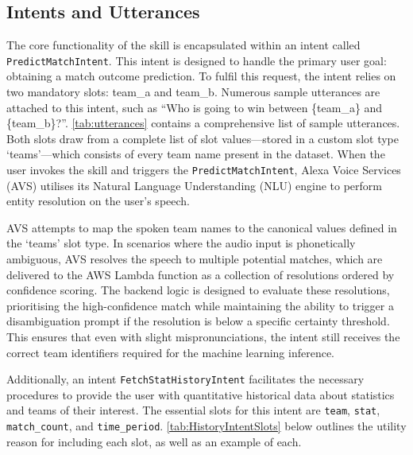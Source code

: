 \subsection{Intents and Utterances}
The core functionality of the skill is encapsulated within an intent called \texttt{PredictMatchI\-ntent}. This intent is designed to handle the primary user goal: obtaining a match outcome prediction. To fulfil this request, the intent relies on two mandatory \glspl{slot}: team\_a and team\_b. Numerous sample utterances are attached to this intent, such as ``Who is going to win between \{team\_a\} and \{team\_b\}?''. \autoref{tab:utterances} contains a comprehensive list of sample utterances. Both slots draw from a complete list of slot values---stored in a custom slot type `teams'---which consists of every team name present in the dataset. When the user invokes the skill and triggers the \texttt{PredictMatchIntent}, Alexa Voice Services (AVS) utilises its Natural Language Understanding (NLU) engine to perform entity resolution on the user's speech.

AVS attempts to map the spoken team names to the canonical values defined in the `teams' slot type. In scenarios where the audio input is phonetically ambiguous, AVS resolves the speech to multiple potential matches, which are delivered to the AWS Lambda function as a collection of resolutions ordered by confidence scoring. The backend logic is designed to evaluate these resolutions, prioritising the high-confidence match while maintaining the ability to trigger a disambiguation prompt if the resolution is below a specific certainty threshold. This ensures that even with slight mispronunciations, the intent still receives the correct team identifiers required for the machine learning inference.

Additionally, an intent \texttt{FetchStatHistoryIntent} facilitates the necessary procedures to provide the user with quantitative historical data about statistics and teams of their interest. The essential slots for this intent are \texttt{team}, \texttt{stat}, \texttt{match\_count}, and \texttt{time\_period}. \autoref{tab:HistoryIntentSlots} below outlines the utility reason for including each slot, as well as an example of each.

